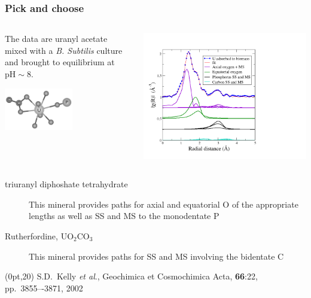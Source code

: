 \begin{frame}
  \frametitle{Pick and choose}
  \begin{columns}
    \begin{column}{0.5\linewidth}
      The data are uranyl acetate mixed with a \textit{B. Subtilis}
      culture and brought to equilibrium at $\mathrm{pH}\sim8$.

      \begin{center}
        \includegraphics[width=3cm]{images/UPC_bw}
      \end{center}
    \end{column}
    \begin{column}{0.5\linewidth}
      \centering\includegraphics[width=\linewidth]{images/ubs}
    \end{column}
  \end{columns}
  \begin{description}
  \item[triuranyl diphoshate tetrahydrate] This mineral provides paths
    for axial and equatorial O of the appropriate lengths as well as
    SS and MS to the monodentate P
  \item[Rutherfordine, UO$_2$CO$_3$] This mineral provides paths for
    SS and MS involving the bidentate C
  \end{description}
  \begin{textblock*}{0.5\linewidth}(0pt,20\TPVertModule) \tiny S.D.\
    Kelly \textit{et al}., Geochimica et Cosmochimica Acta,
    \textbf{66}:22, pp.\ 3855–-3871, 2002
  \end{textblock*}



\end{frame}

